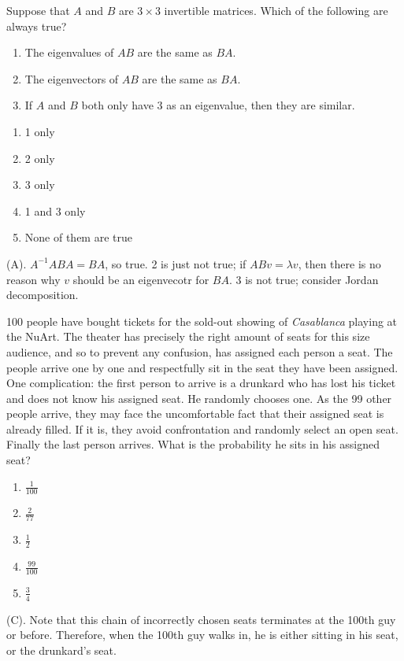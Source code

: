 \begin{exercise}
Suppose that $A$ and $B$ are $3\times 3$ invertible matrices. Which of the following are always true?

\begin{enumerate}[label=(\Roman*)]
    \item The eigenvalues of $AB$ are the same as $BA$.

    \item The eigenvectors of $AB$ are the same as $BA$.

    \item If $A$ and $B$ both only have $3$ as an eigenvalue, then they are similar.
\end{enumerate}

\begin{enumerate}[label=(\Alph*)]
    \item 1 only
    \item 2 only
    \item 3 only
    \item 1 and 3 only
    \item None of them are true
\end{enumerate}
\end{exercise}
\begin{solution}
(A). $A^{-1}ABA = BA$, so true. 2 is just not true; if $ABv = \lambda v$, then there 
is no reason why $v$ should be an eigenvecotr for $BA$. 
3 is not true; consider Jordan decomposition.
\end{solution}

\begin{exercise}
100 people have bought tickets for the sold-out showing of \textit{Casablanca} playing at the NuArt. 
The theater has precisely the right amount of seats for this size audience, and so to prevent any confusion, 
has assigned each person a seat. The people arrive one by one and respectfully sit in the seat they have been assigned. 
One complication: the first person to arrive is a drunkard who has lost his ticket and does not know his assigned seat. 
He randomly chooses one. As the 99 other people arrive, they may face the uncomfortable fact that their assigned seat is already filled. 
If it is, they avoid confrontation and randomly select an open seat. Finally the last person arrives. 
What is the probability he sits in his assigned seat?

\begin{enumerate}[label=(\Alph*)]
    \item $\frac{1}{100}$
    \item $\frac{2}{77}$
    \item $\frac{1}{2}$
    \item $\frac{99}{100}$
    \item $\frac{3}{4}$
\end{enumerate}
\end{exercise}
\begin{solution}
(C). Note that this chain of incorrectly chosen seats terminates at the 100th guy or before.
Therefore, when the 100th guy walks in, he is either sitting in his seat, or the drunkard's seat.
\end{solution}

